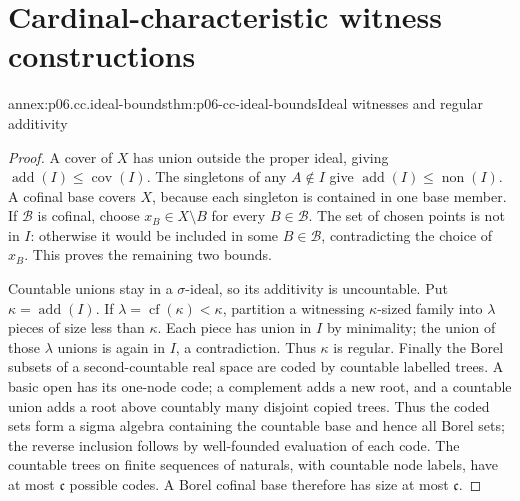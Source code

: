 \section{Cardinal-characteristic witness constructions}
\label{annex:p06-cardinal-characteristics}

\begin{annexitem}{annex:p06.cc.ideal-bounds}{thm:p06-cc-ideal-bounds}{Ideal witnesses and regular additivity}
\begin{proof}
A cover of \(X\) has union outside the proper ideal, giving
\(\operatorname{add}(I)\leq\operatorname{cov}(I)\). The singletons of any
\(A\notin I\) give \(\operatorname{add}(I)\leq\operatorname{non}(I)\).
A cofinal base covers \(X\), because each singleton is contained in one
base member. If \(\mathcal B\) is cofinal, choose \(x_B\in X\setminus B\)
for every \(B\in\mathcal B\). The set of chosen points is not in \(I\):
otherwise it would be included in some \(B\in\mathcal B\), contradicting
the choice of \(x_B\). This proves the remaining two bounds.

Countable unions stay in a \(\sigma\)-ideal, so its additivity is
uncountable. Put \(\kappa=\operatorname{add}(I)\). If
\(\lambda=\operatorname{cf}(\kappa)<\kappa\), partition a witnessing
\(\kappa\)-sized family into \(\lambda\) pieces of size less than
\(\kappa\). Each piece has union in \(I\) by minimality; the union of
those \(\lambda\) unions is again in \(I\), a contradiction. Thus
\(\kappa\) is regular. Finally the Borel subsets of a second-countable
real space are coded by countable labelled trees. A basic open has its
one-node code; a complement adds a new root, and a countable union adds
a root above countably many disjoint copied trees. Thus the coded sets
form a sigma algebra containing the countable base and hence all Borel
sets; the reverse inclusion follows by well-founded evaluation of each
code. The countable trees on finite sequences of naturals, with countable
node labels, have at most \(\mathfrak c\) possible codes. A Borel
cofinal base therefore has size at most \(\mathfrak c\).
\end{proof}
\end{annexitem}

